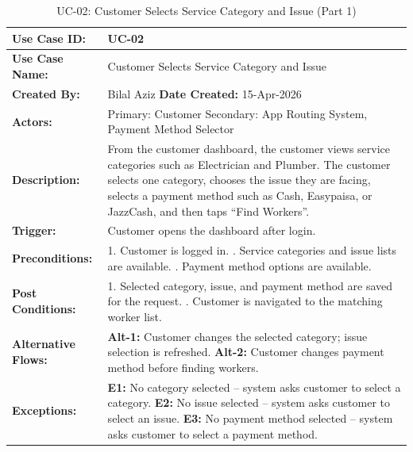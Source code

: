 {\small
\renewcommand{\arraystretch}{1.05}
\begin{table}[H]
\centering
\begin{tabular}{|p{3cm}|p{11.2cm}|}
\hline
\textbf{Use Case ID:} & UC-02 \\ \hline
\textbf{Use Case Name:} & Customer Selects Service Category and Issue \\ \hline
\textbf{Created By:} & Bilal Aziz \hfill \textbf{Date Created:} 15-Apr-2026 \\ \hline
\textbf{Actors:} & Primary: Customer \quad Secondary: App Routing System, Payment Method Selector \\ \hline
\textbf{Description:} & From the customer dashboard, the customer views service categories such as Electrician and Plumber. The customer selects one category, chooses the issue they are facing, selects a payment method such as Cash, Easypaisa, or JazzCash, and then taps ``Find Workers''. \\ \hline
\textbf{Trigger:} & Customer opens the dashboard after login. \\ \hline
\textbf{Preconditions:} & 1. Customer is logged in. \newline 2. Service categories and issue lists are available. \newline 3. Payment method options are available. \\ \hline
\textbf{Post Conditions:} & 1. Selected category, issue, and payment method are saved for the request. \newline 2. Customer is navigated to the matching worker list. \\ \hline
\textbf{Alternative Flows:} & \textbf{Alt-1:} Customer changes the selected category; issue selection is refreshed. \newline \textbf{Alt-2:} Customer changes payment method before finding workers. \\ \hline
\textbf{Exceptions:} & \textbf{E1:} No category selected -- system asks customer to select a category. \newline \textbf{E2:} No issue selected -- system asks customer to select an issue. \newline \textbf{E3:} No payment method selected -- system asks customer to select a payment method. \\ \hline
\end{tabular}
\caption*{UC-02: Customer Selects Service Category and Issue (Part 1)}
\end{table}
}

\newpage


